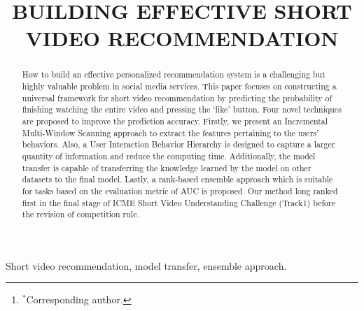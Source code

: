 \documentclass{article}
\begin{document}
\sloppy
\topmargin=0mm

\def\x{{\mathbf x}}
\def\L{{\cal L}}


\title{BUILDING EFFECTIVE SHORT VIDEO RECOMMENDATION}
%
\address{$^1$School of Transportation, Southeast University\\
$^2$UBTECH Sydney Artificial Intelligence Centre and the School of
Information Technologies,\\the Faculty of Engineering and Information
Technologies, the University of Sydney\\
$^1$\{seu\_yangliu, cheng.lyu, zhiyuanl\}@seu.edu.cn,  $^2$dacheng.tao@sydney.edu.au\\
\thanks{$^*$Corresponding author.}
}


\maketitle


%
\begin{abstract}
  How to build an effective personalized recommendation system is a challenging but highly valuable problem in social media services.
  This paper focuses on constructing a universal framework for short video recommendation by predicting the probability of finishing watching the entire video and pressing the `like' button. Four novel techniques are proposed to improve the prediction accuracy.
  Firstly, we present an Incremental Multi-Window Scanning approach to extract the features pertaining to the users' behaviors.
  Also, a User Interaction Behavior Hierarchy is designed to capture a larger quantity of information and reduce the computing time.
  Additionally, the model transfer is capable of transferring the knowledge learned by the model on other datasets to the final model.
  Lastly, a rank-based ensemble approach which is suitable for tasks based on the evaluation metric of AUC is proposed.
  Our method long ranked first in the final stage of ICME Short Video Understanding Challenge (Track1) before the revision of competition rule.
\end{abstract}
%
\begin{keywords}
Short video recommendation, model transfer, ensemble approach.
\end{keywords}
%

\end{document}
